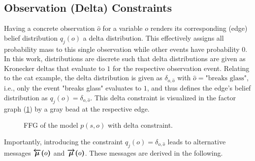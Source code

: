 \subsection{Observation (Delta) Constraints}

Having a concrete observation \(\hat o\) for a variable \(o\) renders its corresponding (edge) belief distribution \(q_j(o)\) a delta distribution. This effectively assigns all probability mass to this single observation while other events have probability \(0\). In this work, distributions are discrete such that delta distributions are given as Kronecker deltas that evaluate to \(1\) for the respective observation event. Relating to the cat example, the delta distribution is given as \(\delta_{o,\hat o}\) with \(\hat o = \text{"breaks glass"}\), i.e., only the event "breaks glass" evaluates to \(1\), and thus defines the edge's belief distribution as \(q_j(o) = \delta_{o,\hat o}\). This delta constraint is visualized in the factor graph (\cref{fig:29}) by a gray bead at the respective edge.
\begin{figure}[htbp]
    \centering


    \caption{FFG of the model \(p(s,o)\) with delta constraint.}
    \label{fig:29}
\end{figure}
Importantly, introducing the constraint \(q_j(o) = \delta_{o,\hat o}\) leads to alternative messages \(\textcolor{black}{\bm{\overleftarrow{\mu}(}o\bm{)}}\) and \(\textcolor{black}{\bm{\overrightarrow{\mu}(}o\bm{)}}\). These messages are derived in the following.

